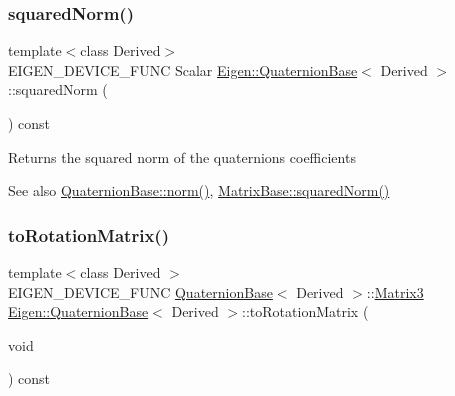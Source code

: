 \subsubsection{\texorpdfstring{squaredNorm()}{squaredNorm()}}
{\footnotesize\ttfamily template$<$class Derived$>$ \\
E\+I\+G\+E\+N\+\_\+\+D\+E\+V\+I\+C\+E\+\_\+\+F\+U\+NC Scalar \mbox{\hyperlink{class_eigen_1_1_quaternion_base}{Eigen\+::\+Quaternion\+Base}}$<$ Derived $>$\+::squared\+Norm (\begin{DoxyParamCaption}{ }\end{DoxyParamCaption}) const\hspace{0.3cm}{\ttfamily [inline]}}

\begin{DoxyReturn}{Returns}
the squared norm of the quaternion\textquotesingle{}s coefficients 
\end{DoxyReturn}
\begin{DoxySeeAlso}{See also}
\mbox{\hyperlink{class_eigen_1_1_quaternion_base_a3c317a676ccae923a9c4a5e80019be17}{Quaternion\+Base\+::norm()}}, \mbox{\hyperlink{class_eigen_1_1_matrix_base_a8782faeb21e43908cdce47cec06fba23}{Matrix\+Base\+::squared\+Norm()}} 
\end{DoxySeeAlso}
\mbox{\label{class_eigen_1_1_quaternion_base_a621c71eec9680bf77342b28a473b6874}} 
\subsubsection{\texorpdfstring{toRotationMatrix()}{toRotationMatrix()}}
{\footnotesize\ttfamily template$<$class Derived $>$ \\
E\+I\+G\+E\+N\+\_\+\+D\+E\+V\+I\+C\+E\+\_\+\+F\+U\+NC \mbox{\hyperlink{class_eigen_1_1_quaternion_base}{Quaternion\+Base}}$<$ Derived $>$\+::\mbox{\hyperlink{class_eigen_1_1_quaternion_base_ac3972e6cb0f56cccbe9e3946a7e494f8}{Matrix3}} \mbox{\hyperlink{class_eigen_1_1_quaternion_base}{Eigen\+::\+Quaternion\+Base}}$<$ Derived $>$\+::to\+Rotation\+Matrix (\begin{DoxyParamCaption}\item[{void}]{ }\end{DoxyParamCaption}) const\hspace{0.3cm}{\ttfamily [inline]}}

